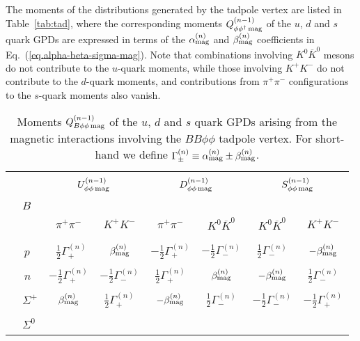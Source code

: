 \documentclass[preprintnumbers,prd,superscriptaddress,preprint]{revtex4-1}
\begin{document}
The moments of the distributions generated by the tadpole vertex are listed in Table~\ref{tab:tad}, where the corresponding moments $Q^{(n-1)}_{ \phi\phi^\dag\,\rm mag}$ of the $u$, $d$ and $s$ quark GPDs are expressed in terms of the $\alpha_{\rm mag}^{(n)}$ and $\beta_{\rm mag}^{(n)}$ coefficients in Eq.~(\ref{eq.alpha-beta-sigma-mag}).
Note that combinations involving $K^0 \overline {K}^0$ mesons do not contribute to the $u$-quark moments, while those involving $K^+ K^-$ do not contribute to the $d$-quark moments, and contributions from $\pi^+ \pi^-$ configurations to the $s$-quark moments also vanish.


\begin{table}[t]
\begin{center}
\caption{Moments $Q^{(n-1)}_{B\phi\phi\,\rm mag}$ of the $u$, $d$ and $s$ quark GPDs arising from the magnetic interactions involving the $BB\phi\phi$ tadpole vertex. For short-hand we define 
$\Gamma_\pm^{(n)} \equiv \alpha_{\rm mag}^{(n)} \pm \beta_{\rm mag}^{(n)}$.\\}
\begin{tabular}{l|cc|cc|cc} \hline
& \multicolumn{2}{c|}{} & \multicolumn{2}{c|}{} &
\\
& \multicolumn{2}{c|}{$U^{(n-1)}_{\phi\phi\,\rm mag}$}
& \multicolumn{2}{c|}{$D^{(n-1)}_{\phi\phi\,\rm mag}$}
& \multicolumn{2}{c}{$S^{(n-1)}_{\phi\phi\,\rm mag}$}
\\
~~$B$ & & & & &
\\
& $\pi^+ \pi^-$ & $K^+ K^-$ 
& $\pi^+ \pi^-$ & $K^0 \overline{K}^0$
& $K^0 \overline{K}^0$
& $K^+ K^-$ 
\\ 
& & & & &
\\ \hline
& & & & &
\\
~~\,$p$ &
~$\frac12 \Gamma_+^{(n)}$ & 
$\beta_{\rm mag}^{(n)}$ & 
$-\frac12 \Gamma_+^{(n)}$ &
$-\frac12 \Gamma_-^{(n)}$ & 
$\frac12 \Gamma_-^{(n)}$ &
$-\beta_{\rm mag}^{(n)}$ 
\\
& & & & &
\\
~~\,$n$ &
$-\frac12 \Gamma_+^{(n)}$ &
$-\frac12 \Gamma_-^{(n)}$ &
$\frac12 \Gamma_+^{(n)}$ &
$\beta_{\rm mag}^{(n)}$ &
$-\beta_{\rm mag}^{(n)}$ &
$\frac12 \Gamma_-^{(n)}$
\\
& & & & &
\\
~~$\Sigma^+$ &
$\beta_{\rm mag}^{(n)}$ &
$\frac12 \Gamma_+^{(n)}$ &
$-\beta_{\rm mag}^{(n)}$ &
$\frac12 \Gamma_-^{(n)}$ &
$-\frac12 \Gamma_-^{(n)}$ &
$-\frac12 \Gamma_+^{(n)}$
\\
& & & & &
\\
~~$\Sigma^0$ & 

\end{tabular}
\end{center}
\end{table}
\end{document}
